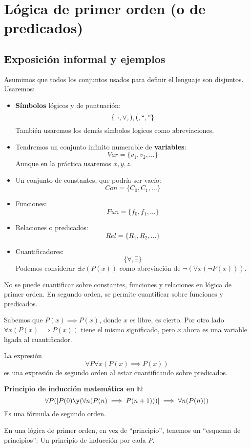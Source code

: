 \section{Lógica de primer orden (o de predicados)}
\subsection{Exposición informal y ejemplos}
Asumimos que todos los conjuntos usados para definir el lenguaje son disjuntos. Usaremos:
\begin{itemize}
	\item \textbf{Símbolos} lógicos y de puntuación:
	$$\{\neg, \vee, ),(, ``," \}$$
	También usaremos los demás símbolos logicos como abreviaciones.
	\item Tendremos un conjunto infinito numerable de \textbf{variables}:
	$$Var = \{v_1, v_2, \hdots\}$$
	Aunque en la práctica usaremos $x,y,z$.
	\item Un conjunto de constantes, que podría ser vacío:
	$$Con = \{C_0, C_1, \hdots\}$$
	\item Funciones:
	$$Fun = \{f_0, f_1, \hdots\}$$
	\item Relaciones o predicados:
	$$Rel = \{R_1, R_2, \hdots\}$$
	\item Cuantificadores:
	$$\{\forall, \exists\}$$
	Podemos considerar $\exists x(P(x))$ como abreviación de $\neg (\forall x(\neg P(x)))$.
\end{itemize}

No se puede cuantificar sobre constantes, funciones y relaciones en lógica de primer orden. En segundo orden, se permite cuantificar sobre funciones y predicados.

\begin{example}

Sabemos que $P(x) \implies P(x)$, donde $x$ es libre, es cierto. Por otro lado $\forall x(P(x)\implies P(x))$ tiene el mismo significado, pero $x$ ahora es una variable ligada al cuantificador.
\end{example}

\begin{example}

La expresión
\[\forall P \forall x (P(x)\implies P(x))\]
es una expresión de segundo orden al estar cuantificando sobre predicados.
\end{example}

\begin{mdframed}
	\textbf{Principio de inducción matemática en $\mathbb{N}$}:
	$$\forall P (\left[P(0)\y (\forall n(P(n)\implies P(n+1)))\right]\implies \forall n(P(n)))$$
	Es una fórmula de segundo orden.
\end{mdframed}
En una lógica de primer orden, en vez de ``principio'', tenemos un ``esquema de principios'': Un principio de inducción por cada $P$.

